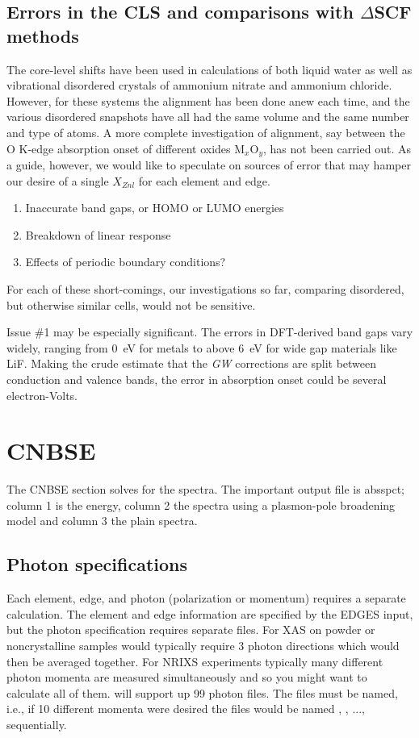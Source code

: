 \documentclass[11pt]{report}
\begin{document}
\section{Errors in the CLS and comparisons with $\Delta$SCF methods}

The core-level shifts have been used in  calculations of both liquid water as well as vibrational disordered crystals of ammonium nitrate and ammonium chloride. 
However, for these systems the alignment has been done anew each time, and the various disordered snapshots have all had the same volume and the same number and type of atoms.
A more complete investigation of alignment, say between the O K-edge absorption onset of different oxides M$_x$O$_y$, has not been carried out.
As a guide, however, we would like to speculate on sources of error that may hamper our desire of a single $X_{Znl}$ for each element and edge.
\begin{enumerate}
\item{Inaccurate band gaps, or HOMO or LUMO energies}
\item{Breakdown of linear response}
\item{Effects of periodic boundary conditions?}
\end{enumerate}
For each of these short-comings, our investigations so far, comparing disordered, but otherwise similar cells, would not be sensitive.

Issue \#1 may be especially significant. The errors in DFT-derived band gaps vary widely, ranging from 0~eV for metals to above 6~eV for wide gap materials like LiF.
Making the crude estimate that the {\it GW} corrections are split between conduction and valence bands, the error in absorption onset could be several electron-Volts.

\chapter{ CNBSE }
The CNBSE section solves for the spectra. The important output file is absspct; column 1 is the energy, 
column 2 the spectra using a plasmon-pole broadening model and column 3 the plain spectra.

\iffalse
\section{Photon specifications}

Each element, edge, and photon (polarization or momentum) requires a separate calculation. 
The element and edge information are specified by the EDGES input, but the photon specification requires separate files. For XAS on 
powder or noncrystalline samples would typically require 3 photon directions which would then be averaged together. For NRIXS 
experiments typically many different photon momenta are measured simultaneously and so you might want to calculate all of them. 
 will support up 99 photon files. The files must be named, i.e., if 10 different momenta were desired the files would be named 
, , ...,  sequentially. 
\end{document}
